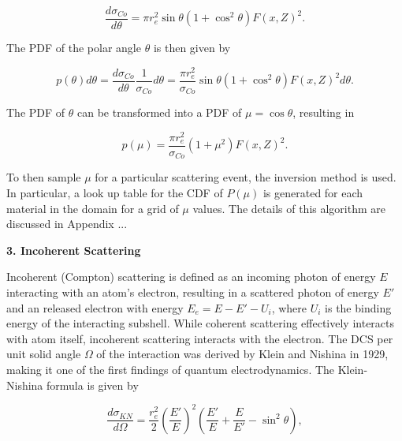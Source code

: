 \documentclass[%
 aip,
cp,  %
 amsmath,amssymb,%
reprint,%
]{revtex4-2}
\begin{document}
\begin{equation}
    \frac{d\sigma_{Co}}{d\theta} = \pi r_e^2 \sin \theta (1 + \cos^2 \theta) F(x, Z)^2.
\end{equation}

\par The PDF of the polar angle $\theta$ is then given by

\begin{equation}
    p(\theta) d\theta = \frac{d\sigma_{Co}}{d\theta} \frac{1}{\sigma_{Co}} d\theta = \frac{\pi r_e^2}{\sigma_{Co}} \sin \theta (1 + \cos^2 \theta) F(x, Z)^2 d \theta.
\end{equation}

\par The PDF of $\theta$ can be transformed into a PDF of $\mu = \cos \theta$, resulting in

\begin{equation}
    p(\mu) = \frac{\pi r_e^2}{\sigma_{Co}} (1 + \mu^2) F(x, Z)^2.
\end{equation}

To then sample $\mu$ for a particular scattering event, the inversion method is used. In particular, a look up table for the CDF of $P(\mu)$ is generated for each material in the domain for a grid of $\mu$ values. The details of this algorithm are discussed in Appendix ... \\

\begin{large}
    \bf{3. Incoherent Scattering}
\end{large}

\par Incoherent (Compton) scattering is defined as an incoming photon of energy $E$ interacting with an atom's electron, resulting in a scattered photon of energy $E'$ and an released electron with energy $E_e = E - E' - U_i$, where $U_i$ is the binding energy of the interacting subshell. While coherent scattering effectively interacts with atom itself, incoherent scattering interacts with the electron. The DCS per unit solid angle $\Omega$ of the interaction was derived by Klein and Nishina in 1929, making it one of the first findings of quantum electrodynamics. The Klein-Nishina formula is given by

\begin{equation}
    \frac{d\sigma_{KN}}{d\Omega} = \frac{r_e^2}{2} \left(\frac{E'}{E}\right)^2 \left(\frac{E'}{E} + \frac{E}{E'} - \sin^2 \theta \right),
\end{equation}
\end{document}

